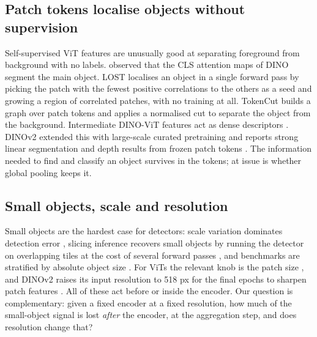 \documentclass[10pt,letterpaper,twocolumn]{article}
\begin{document}
\subsection{Patch tokens localise objects without supervision}
\label{sec:lit-patch}
Self-supervised ViT features are unusually good at separating foreground from background with
no labels. \citet{caron2021dino} observed that the CLS attention maps of DINO segment the main
object. LOST \citep{simeoni2021lost} localises an object in a single forward pass by picking
the patch with the fewest positive correlations to the others as a seed and growing a region of
correlated patches, with no training at all. TokenCut \citep{wang2022tokencut} builds a graph
over patch tokens and applies a normalised cut to separate the object from the background.
Intermediate DINO-ViT features act as dense descriptors \citep{amir2022deepvit}. DINOv2 extended this with large-scale curated
pretraining and reports strong linear segmentation and depth results from frozen patch tokens
\citep{oquab2024dinov2}. The information needed to find and classify an object survives in the tokens; at issue is whether global pooling keeps it.

\subsection{Small objects, scale and resolution}
Small objects are the hardest case for detectors: scale variation dominates detection error
\citep{singh2018snip}, slicing inference recovers small objects by running the detector on
overlapping tiles at the cost of several forward passes \citep{akyon2022sahi}, and benchmarks
are stratified by absolute object size \citep{cheng2023smallobject}. For ViTs the relevant knob
is the patch size \citep{beyer2023flexivit}, and DINOv2 raises its input resolution to 518 px
for the final epochs to sharpen patch features \citep{oquab2024dinov2}. All of these act before
or inside the encoder. Our question is complementary: given a fixed encoder at a fixed
resolution, how much of the small-object signal is lost \emph{after} the encoder, at the
aggregation step, and does resolution change that?
\end{document}
